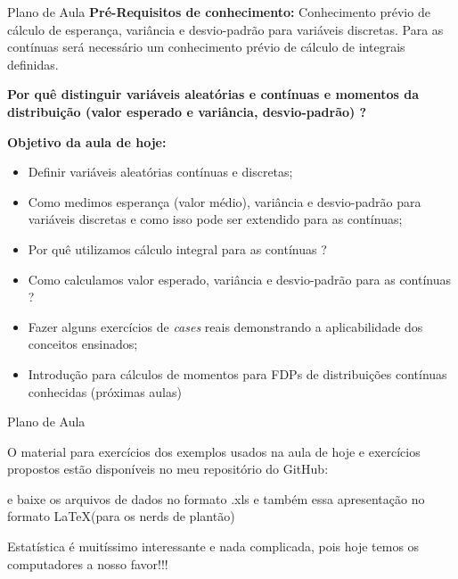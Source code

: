 \documentclass{beamer}
\begin{document}
\begin{frame}{Plano de Aula}
\vspace{-.5cm}
\footnotesize
\textbf{Pré-Requisitos de conhecimento:} Conhecimento prévio de cálculo de esperança, variância e desvio-padrão para variáveis discretas. Para as contínuas será necessário um conhecimento prévio de cálculo de integrais definidas. 

\textbf{Por quê distinguir variáveis aleatórias e contínuas e momentos da distribuição (valor esperado e variância, desvio-padrão) ?}

\textbf{Objetivo da aula de hoje:}

    \begin{itemize}
        \item Definir variáveis aleatórias contínuas e discretas;
        \item Como medimos esperança (valor médio), variância e desvio-padrão para variáveis discretas e como isso pode ser extendido para as contínuas;
        \item Por quê utilizamos cálculo integral para as contínuas ?
        \item Como calculamos valor esperado, variância e desvio-padrão para as contínuas ?
        \item Fazer alguns exercícios de \textit{cases} reais demonstrando a aplicabilidade dos conceitos ensinados;
        \item Introdução para cálculos de momentos para FDPs de distribuições contínuas conhecidas (próximas aulas)
    \end{itemize}
    

\end{frame}
\begin{frame}{Plano de Aula}
    
O material para exercícios dos exemplos usados na aula de hoje e exercícios propostos estão disponíveis no meu repositório do GitHub:

\vspace{.5cm}
 e baixe os arquivos de dados no formato .xls e também essa apresentação no formato \LaTeX (para os nerds de plantão)



\vspace{.5cm}
Estatística é muitíssimo interessante e nada complicada, pois hoje temos os computadores a nosso favor!!!
        
    
\end{frame}
\end{document}
